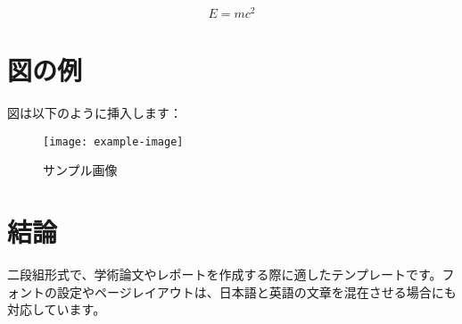 \documentclass[a4paper,10pt,twocolumn]{article}
\begin{document}
\begin{equation}
E = mc^2
\end{equation}

\section{図の例}
図は以下のように挿入します：

\begin{figure}[h]
\centering
\texttt{[image: example-image]}
\caption{サンプル画像}
\label{fig:example}
\end{figure}


\section{結論}
二段組形式で、学術論文やレポートを作成する際に適したテンプレートです。フォントの設定やページレイアウトは、日本語と英語の文章を混在させる場合にも対応しています。
\end{document}
